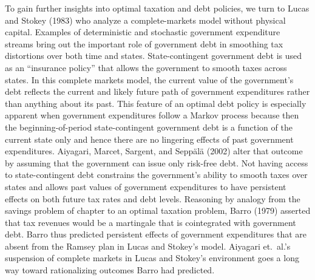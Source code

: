 To gain further insights into optimal taxation and debt policies,
we turn to Lucas and Stokey (1983)
who analyze a complete-markets model without physical capital.  Examples of deterministic
and stochastic government expenditure streams bring out the important
role of government debt in smoothing tax distortions over both time
and states. State-contingent government debt is used as an ``insurance policy'' that allows the government to smooth
taxes across  states.  In this complete markets model, the current value
of the government's debt reflects the current and likely future path
of government expenditures rather than anything about its past.  This
feature of an optimal debt policy is especially apparent when government
expenditures follow a Markov process because then the beginning-of-period
state-contingent government debt is a function of the current state only
and hence there are no lingering effects of past government expenditures.
 Aiyagari, Marcet, Sargent, and Sepp\"al\"a (2002)
alter that outcome %
by assuming that the government can  issue only risk-free debt. Not
having access to state-contingent debt constrains the government's
ability to smooth taxes over states and allows  past values of
government expenditures to have persistent effects on both future
tax rates and debt levels.  Reasoning by analogy from the savings
problem of chapter  to an optimal taxation
problem, Barro (1979) asserted that tax revenues would be a
martingale that is  cointegrated with government debt.
Barro thus predicted  persistent effects of
government expenditures that are absent from the Ramsey plan  in Lucas and Stokey's
model. Aiyagari et.\ al.'s suspension of complete markets in Lucas
and Stokey's environment goes a long way  toward rationalizing
outcomes Barro had predicted.   

